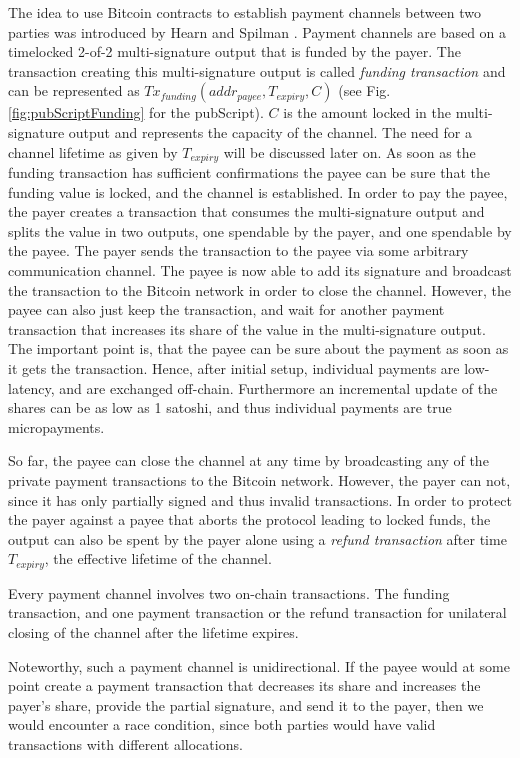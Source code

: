 The idea to use Bitcoin contracts to establish payment channels between two parties was introduced by Hearn and Spilman \parencite{Hearn2013,Spilman2013}. Payment channels are based on a timelocked 2-of-2 multi-signature output that is funded by the payer. The transaction creating this multi-signature output is called \emph{funding transaction} and can be represented as $Tx_{funding}(addr_{payee},T_{expiry},C)$ (see Fig. \ref{fig:pubScriptFunding} for the pubScript). $C$ is the amount locked in the multi-signature output and represents the capacity of the channel. The need for a channel lifetime as given by $T_{expiry}$ will be discussed later on.
As soon as the funding transaction has sufficient confirmations the payee can be sure that the funding value is locked, and the channel is established. In order to pay the payee, the payer creates a transaction that consumes the multi-signature output and splits the value in two outputs, one spendable by the payer, and one spendable by the payee. The payer sends the transaction to the payee via some arbitrary communication channel. The payee is now able to add its signature and broadcast the transaction to the Bitcoin network in order to close the channel. However, the payee can also just keep the transaction, and wait for another payment transaction that increases its share of the value in the multi-signature output. The important point is, that the payee can be sure about the payment as soon as it gets the transaction. Hence, after initial setup, individual payments are low-latency, and are exchanged off-chain. Furthermore an incremental update of the shares can be as low as 1 satoshi, and thus individual payments are true micropayments. 

So far, the payee can close the channel at any time by broadcasting any of the private payment transactions to the Bitcoin network. However, the payer can not, since it has only partially signed and thus invalid transactions. In order to protect the payer against a payee that aborts the protocol leading to locked funds, the output can also be spent by the payer alone using a \emph{refund transaction} after time $T_{expiry}$, the effective lifetime of the channel.

Every payment channel involves two on-chain transactions. The funding transaction, and one payment transaction or the refund transaction for unilateral closing of the channel after the lifetime expires.

Noteworthy, such a payment channel is unidirectional. If the payee would at some point create a payment transaction that decreases its share and increases the payer's share, provide the partial signature, and send it to the payer, then we would encounter a race condition, since both parties would have valid transactions with different allocations. 

